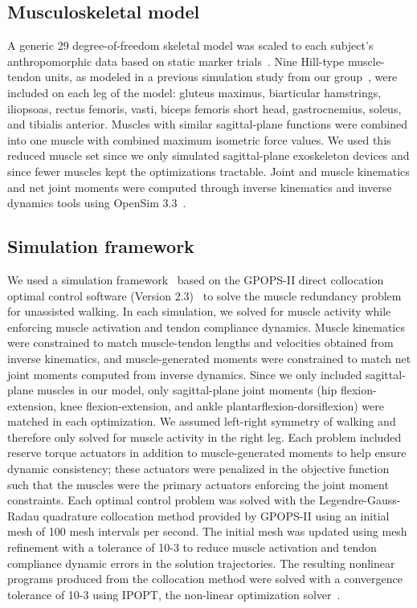 \documentclass[10pt,letterpaper]{article}
\begin{document}
\subsection*{Musculoskeletal model}
A generic 29 degree-of-freedom skeletal model was scaled to each subject’s anthropomorphic data based on static marker trials~\cite{Rajagopal:2016}. Nine Hill-type muscle-tendon units, as modeled in a previous simulation study from our group~\cite{Ong:2019}, were included on each leg of the model: gluteus maximus, biarticular hamstrings, iliopsoas, rectus femoris, vasti, biceps femoris short head, gastrocnemius, soleus, and tibialis anterior. Muscles with similar sagittal-plane functions were combined into one muscle with combined maximum isometric force values. We used this reduced muscle set since we only simulated sagittal-plane exoskeleton devices and since fewer muscles kept the optimizations tractable. Joint and muscle kinematics and net joint moments were computed through inverse kinematics and inverse dynamics tools using OpenSim 3.3~\cite{Delp:2007}.

\subsection*{Simulation framework}
We used a simulation framework~\cite{DeGroote:2016} based on the GPOPS-II direct collocation optimal control software (Version 2.3)~\cite{Patterson:2014} to solve the muscle redundancy problem for unassisted walking. In each simulation, we solved for muscle activity while enforcing muscle activation and tendon compliance dynamics. Muscle kinematics were constrained to match muscle-tendon lengths and velocities obtained from inverse kinematics, and muscle-generated moments were constrained to match net joint moments computed from inverse dynamics. Since we only included sagittal-plane muscles in our model, only sagittal-plane joint moments (hip flexion-extension, knee flexion-extension, and ankle plantarflexion-dorsiflexion) were matched in each optimization. We assumed left-right symmetry of walking and therefore only solved for muscle activity in the right leg. Each problem included reserve torque actuators in addition to muscle-generated moments to help ensure dynamic consistency; these actuators were penalized in the objective function such that the muscles were the primary actuators enforcing the joint moment constraints. Each optimal control problem was solved with the Legendre-Gauss-Radau quadrature collocation method provided by GPOPS-II using an initial mesh of 100 mesh intervals per second. The initial mesh was updated using mesh refinement with a tolerance of 10-3 to reduce muscle activation and tendon compliance dynamic errors in the solution trajectories. The resulting nonlinear programs produced from the collocation method were solved with a convergence tolerance of 10-3 using IPOPT, the non-linear optimization solver~\cite{Wachter:2006}.
\end{document}
